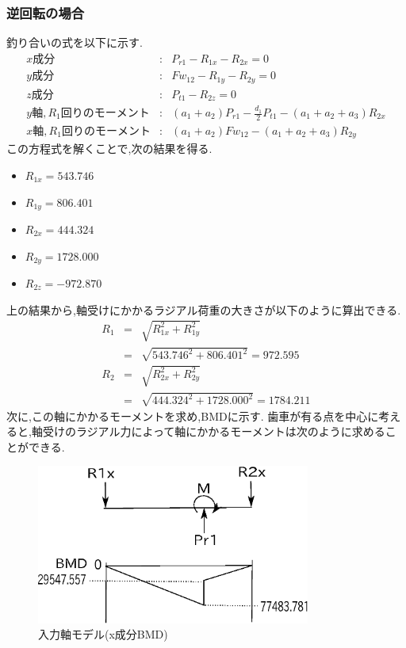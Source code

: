 \subsubsection{逆回転の場合}
釣り合いの式を以下に示す.
\begin{eqnarray}
x成分&:&P_{r1}-R_{1x}-R_{2x}=0\\
y成分&:&Fw_{12}-R_{1y}-R_{2y}=0\\
z成分&:&P_{t1}-R_{2z}=0\\
y軸,R_1回りのモーメント&:&(a_1+a_2)P_{r1}-\frac{d_1}{2}P_{t1}-(a_1+a_2+a_3)R_{2x}\\
x軸,R_1回りのモーメント&:&(a_1+a_2)Fw_{12}-(a_1+a_2+a_3)R_{2y}
\end{eqnarray}
この方程式を解くことで,次の結果を得る.
\begin{itemize}
\item $R_{1x}=543.746$
\item $R_{1y}=806.401$
\item $R_{2x}=444.324$
\item $R_{2y}=1728.000$
\item $R_{2z}=-972.870$
\end{itemize}
上の結果から,軸受けにかかるラジアル荷重の大きさが以下のように算出できる.
\begin{eqnarray}
R_1 &=& \sqrt {R_{1x}^2+R_{1y}^2}\\
    &=& \sqrt {543.746^2+806.401^2}=972.595\\
R_2 &=& \sqrt {R_{2x}^2+R_{2y}^2}\\
    &=& \sqrt {444.324^2+1728.000^2}=1784.211
\end{eqnarray}
次に,この軸にかかるモーメントを求め,BMDに示す.
歯車が有る点を中心に考えると,軸受けのラジアル力によって軸にかかるモーメントは次のように求めることができる.
\begin{figure}[htbp]
\begin{center}
\includegraphics[width=9cm]{../picture/jiku142.eps}
\end{center}
\caption{入力軸モデル(x成分BMD)}
\end{figure}
